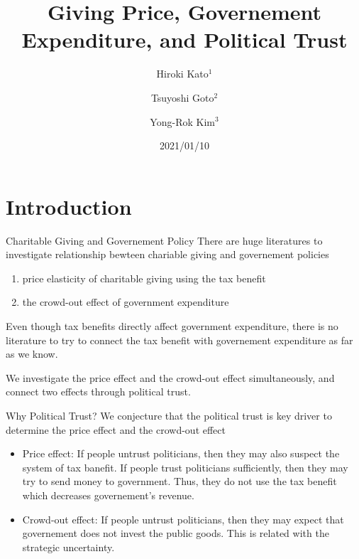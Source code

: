 \documentclass[
  ignorenonframetext,
]{beamer}
\title{Giving Price, Governement Expenditure, and Political Trust}
\author{Hiroki Kato\(^1\) \and Tsuyoshi Goto\(^2\) \and Yong-Rok
Kim\(^3\)}
\date{2021/01/10}
\institute{\(^1\)Osaka University \and \(^2\)Chiba
University \and \(^3\)Kobe University}
\providecommand{\tightlist}{%
  \setlength{\itemsep}{0pt}\setlength{\parskip}{0pt}}
\begin{document}
\frame{\titlepage}

\hypertarget{introduction}{%
\section{Introduction}\label{introduction}}

\begin{frame}{Charitable Giving and Governement Policy}
\protect\hypertarget{charitable-giving-and-governement-policy}{}
There are huge literatures to investigate relationship bewteen chariable
giving and governement policies

\begin{enumerate}
\tightlist
\item
  price elasticity of charitable giving using the tax benefit
\item
  the crowd-out effect of government expenditure
\end{enumerate}

Even though tax benefits directly affect government expenditure, there
is no literature to try to connect the tax benefit with governement
expenditure as far as we know.

We investigate the price effect and the crowd-out effect simultaneously,
and connect two effects through political trust.
\end{frame}

\begin{frame}{Why Political Trust?}
\protect\hypertarget{why-political-trust}{}
We conjecture that the political trust is key driver to determine the
price effect and the crowd-out effect

\begin{itemize}
\tightlist
\item
  Price effect: If people untrust politicians, then they may also
  suspect the system of tax banefit. If people trust politicians
  sufficiently, then they may try to send money to government. Thus,
  they do not use the tax benefit which decreases governement's revenue.
\item
  Crowd-out effect: If people untrust politicians, then they may expect
  that governement does not invest the public goods. This is related
  with the strategic uncertainty.
\end{itemize}
\end{frame}
\end{document}
